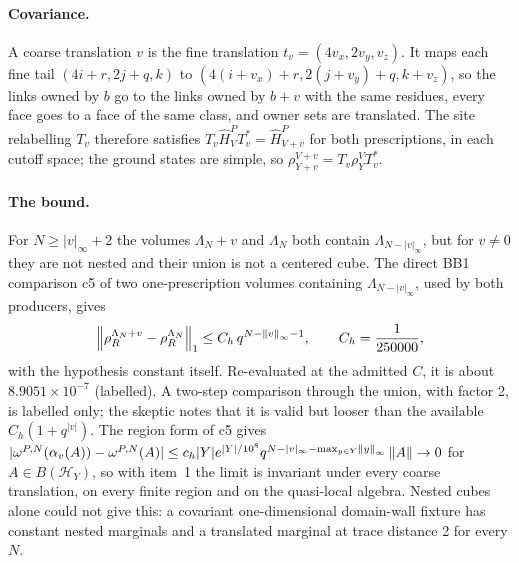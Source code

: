 \paragraph{Covariance.} A coarse translation $v$ is the fine translation
$t_v=(4v_x,2v_y,v_z)$. It maps each fine tail $(4i+r,2j+q,k)$ to
$(4(i+v_x)+r,2(j+v_y)+q,k+v_z)$, so the links owned by $b$ go to the links
owned by $b+v$ with the same residues, every face goes to a face of the same
class, and owner sets are translated. The site relabelling $T_v$ therefore
satisfies $T_v\widehat H^P_VT_v^*=\widehat H^P_{V+v}$ for both prescriptions,
in each cutoff space; the ground states are simple, so
$\rho^{V+v}_{Y+v}=T_v\rho^V_YT_v^*$.

\paragraph{The bound.} For $N\ge|v|_\infty+2$ the volumes $\Lambda_N+v$ and
$\Lambda_N$ both contain $\Lambda_{N-|v|_\infty}$, but for $v\ne0$ they are not
nested and their union is not a centered cube. The direct BB1 comparison c5
of two one-prescription volumes containing $\Lambda_{N-|v|_\infty}$, used by
both producers, gives
\begin{equation}
 \left\lVert\rho^{\Lambda_N+v}_R-\rho^{\Lambda_N}_R\right\rVert_1\le C_h\,q^{N-\left\lVert v\right\rVert_\infty-1},\qquad
 C_h=\frac1{250000},
 \label{eq:bb2-translation}
\end{equation}
with the hypothesis constant itself. Re-evaluated at the admitted $C$, it is
about $8.9051\times10^{-7}$ (labelled). A two-step comparison through the
union, with factor 2, is labelled only; the skeptic notes that it is valid
but looser than the available $C_h(1+q^{|v|})$. The region form of c5 gives
$|\omega^{P,N}(\alpha_v(A))-\omega^{P,N}(A)|\le c_h|Y|e^{|Y|/10^8}
q^{N-|v|_\infty-\max_{y\in Y}\left\lVert y\right\rVert_\infty}\left\lVert A\right\rVert\to0$ for $A\in B(\mathcal H_Y)$,
so with item~1 the limit is invariant under every coarse translation, on
every finite region and on the quasi-local algebra. Nested cubes alone could
not give this: a covariant one-dimensional domain-wall fixture has constant
nested marginals and a translated marginal at trace distance 2 for every $N$.

